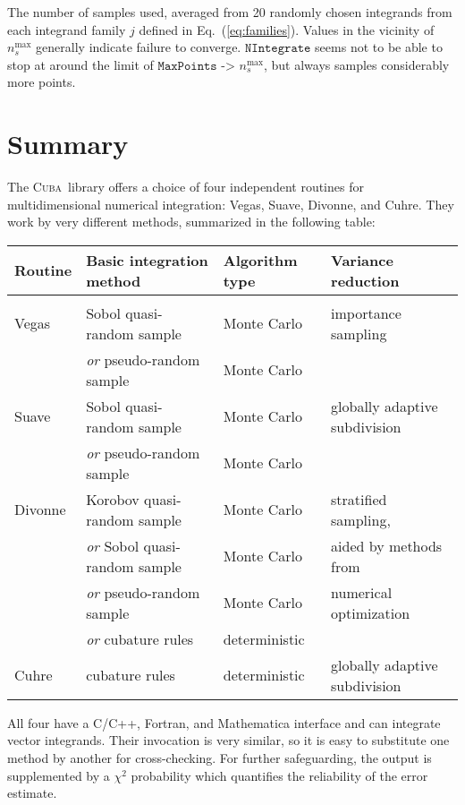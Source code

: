 \documentclass[12pt]{article}
\newcommand\cuba{\textsc{Cuba}}
\newcommand\nmax{n_s^{\text{max}}}
\newcommand\Code[1]{\ensuremath{\texttt{#1}}}
\begin{document}
\begin{table}
\caption{\label{tab:comp}The number of samples used, averaged from 20
randomly chosen integrands from each integrand family $j$ defined in
Eq.~(\ref{eq:families}).  Values in the vicinity of $\nmax$ generally
indicate failure to converge. \Code{NIntegrate} seems not to be able
to stop at around the limit of \Code{MaxPoints -> $\nmax$}, but always
samples considerably more points.}
\end{table}


\section{Summary}

The \cuba\ library offers a choice of four independent routines for
multidimensional numerical integration: Vegas, Suave, Divonne, and
Cuhre.  They work by very different methods, summarized in the following
table:
\begin{center}
\begin{small}
\begin{tabular}{llll}
Routine  &
	Basic integration method &
	Algorithm type &
	Variance reduction \\ \hline \\[-1.5ex]
Vegas &
	Sobol quasi-random sample &
	Monte Carlo &
	importance sampling \\
&
	\textit{or} pseudo-random sample &
	Monte Carlo \\[1.5ex]
Suave &
	Sobol quasi-random sample &
	Monte Carlo &
	globally adaptive subdivision \\
&
	\textit{or} pseudo-random sample &
	Monte Carlo \\[1.5ex]
Divonne &
	Korobov quasi-random sample &
	Monte Carlo &
	stratified sampling, \\
&
	\textit{or} Sobol quasi-random sample &
	Monte Carlo &
	\quad aided by methods from \\
&
	\textit{or} pseudo-random sample &
	Monte Carlo &
	\quad numerical optimization \\
&
	\textit{or} cubature rules &
	deterministic \\[1.5ex]
Cuhre &
	cubature rules &
	deterministic &
	globally adaptive subdivision
\end{tabular}
\end{small}
\end{center}

All four have a C/C++, Fortran, and Mathematica interface and can
integrate vector integrands.  Their invocation is very similar, so it is
easy to substitute one method by another for cross-checking.  For
further safeguarding, the output is supplemented by a $\chi^2$
probability which quantifies the reliability of the error estimate.
\end{document}
